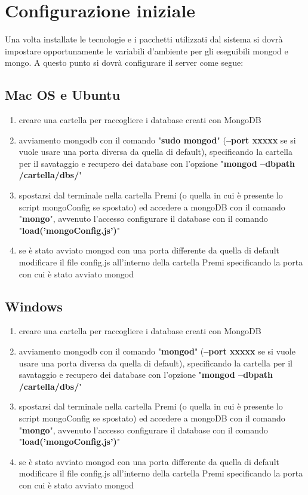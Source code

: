 \section{Configurazione iniziale}
Una volta installate le tecnologie e i pacchetti utilizzati dal sistema si dovr\`{a} impostare opportunamente le variabili d'ambiente per gli eseguibili mongod e mongo.
A questo punto si dovr\`{a} configurare il server come segue:

\subsection{Mac OS e Ubuntu}

\begin{enumerate}

\item creare una cartella per raccogliere i database creati con MongoDB
\item avviamento mongodb con il comando "\textbf{sudo mongod}" (\textbf{--port xxxxx} se si vuole usare una porta diversa da quella di default), specificando la cartella per il savataggio e recupero dei database con l'opzione "\textbf{mongod --dbpath /cartella/dbs/}"
\item  spostarsi dal terminale nella cartella Premi (o quella in cui \`{e} presente lo script mongoConfig se spostato) ed accedere a mongoDB con il comando "\textbf{mongo}", avvenuto l'accesso configurare il database con il comando "\textbf{load('mongoConfig.js')}"
\item se \`{e} stato avviato mongod con una porta differente da quella di default modificare il file config.js all'interno della cartella Premi specificando la porta con cui \`{e} stato avviato mongod

\end{enumerate}


\subsection{Windows}

\begin{enumerate}

\item creare una cartella per raccogliere i database creati con MongoDB
\item avviamento mongodb con il comando "\textbf{mongod}" (\textbf{--port xxxxx} se si vuole usare una porta diversa da quella di default), specificando la cartella per il savataggio e recupero dei database con l'opzione "\textbf{mongod --dbpath /cartella/dbs/}"
\item  spostarsi dal terminale nella cartella Premi (o quella in cui \`{e} presente lo script mongoConfig se spostato) ed accedere a mongoDB con il comando "\textbf{mongo}", avvenuto l'accesso configurare il database con il comando "\textbf{load('mongoConfig.js')}"
\item se \`{e} stato avviato mongod con una porta differente da quella di default modificare il file config.js all'interno della cartella Premi specificando la porta con cui \`{e} stato avviato mongod

\end{enumerate}

